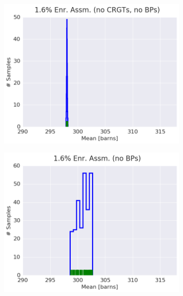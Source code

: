 \begin{figure}[h!]
\centering
\begin{subfigure}{0.5\textwidth}
  \centering
  \includegraphics[width=\linewidth]{figures/patterns/assm-1.6-inf/hist-kde-rug/assm-16-inf-fiss-2}
  \caption{}
  \label{fig:chap9-hist-assm-1.6-inf-fiss}
\end{subfigure}%
\begin{subfigure}{0.5\textwidth}
  \centering
  \includegraphics[width=\linewidth]{figures/patterns/assm-1.6/hist-kde-rug/assm-16-fiss-2}
  \caption{}
  \label{fig:chap9-hist-assm-1.6-fiss}
\end{subfigure}

\end{figure}
